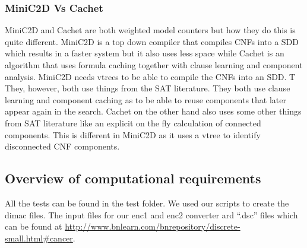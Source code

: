 \subsubsection{MiniC2D Vs Cachet}
MiniC2D and Cachet are both weighted model counters but how they do this is quite different.
MiniC2D is a top down compiler that compiles CNFs into a SDD which results in a faster system but it also uses less space while Cachet is an algorithm that uses formula caching together with clause learning and component analysis. MiniC2D needs vtrees to be able to compile the CNFs into an SDD.
T%
They, however, both use things from the SAT literature. 
They both use clause learning and component caching as to be able to reuse components that later appear again in the search. Cachet on the other hand also uses some other things from SAT literature like an explicit on the fly calculation of connected components. This is different in MiniC2D as it uses a vtree to identify disconnected CNF components.
\cite{MiniC2D} \cite{Cachet}

\subsection{Overview of computational requirements}
All the tests can be found in the test folder.
We used our scripts to create the dimac files. The input files for our enc1 and enc2 converter ard ``.dsc'' files which can be found at 
\url{http://www.bnlearn.com/bnrepository/discrete-small.html#cancer}.

